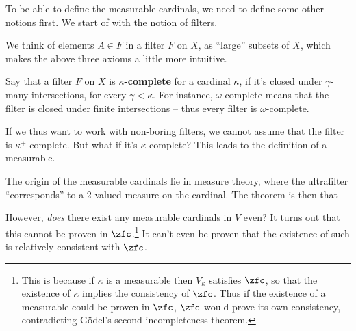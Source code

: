 \qquad To be able to define the measurable cardinals, we need to define some other notions first. We start of with the notion of filters.


We think of elements $A\in F$ in a filter $F$ on $X$, as ``large'' subsets of $X$, which makes the above three axioms a little more intuitive.


Say that a filter $F$ on $X$ is \textbf{$\kappa$-complete} for a cardinal $\kappa$, if it's closed under $\gamma$-many intersections, for every $\gamma<\kappa$. For instance, $\omega$-complete means that the filter is closed under finite intersections -- thus every filter is $\omega$-complete.


If we thus want to work with non-boring filters, we cannot assume that the filter is $\kappa^+$-complete. But what if it's $\kappa$-complete? This leads to the definition of a measurable.


The origin of the measurable cardinals lie in measure theory, where the ultrafilter ``corresponds'' to a 2-valued measure on the cardinal. The theorem is then that


However, \textit{does} there exist any measurable cardinals in $V$ even? It turns out that this cannot be proven in $\zfc$.\footnote{This is because if $\kappa$ is a measurable then $V_\kappa$ satisfies $\zfc$, so that the existence of $\kappa$ implies the consistency of $\zfc$. Thus if the existence of a measurable could be proven in $\zfc$, $\zfc$ would prove its own consistency, contradicting Gödel's second incompleteness theorem.} It can't even be proven that the existence of such is relatively consistent with $\zfc$.


